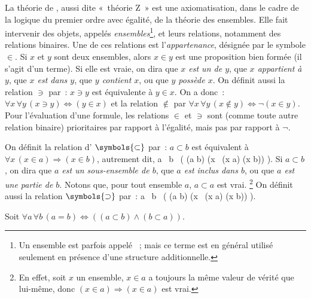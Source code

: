 \startsection[title=Théorie ZFC]

\startsubsection[title=La théorie de Zermelo, reference=sec:Zermelo]

La théorie de , aussi dite « théorie Z » est une axiomatisation, dans le cadre de la logique du premier ordre avec égalité, de la théorie des ensembles. 
Elle fait intervenir des objets, appelés \emph{ensembles}\footnote{Un ensemble est parfois appelé \emph{} ; mais ce terme est en général utilisé seulement en présence d'une structure additionnelle.}, et leurs relations, notamment des relations binaires. 
Une de ces relations est l'\emph{appartenance}, désignée par le symbole $\in$. 
Si $x$ et $y$ sont deux ensembles, alors $x \in y$ est une proposition bien formée (il s'agit d'un terme). 
Si elle est vraie, on dira que \emph{$x$ est un  de $y$}, que \emph{$x$ appartient à $y$}, que \emph{$x$ est dans $y$}, que \emph{$y$ contient $x$}, ou que \emph{$y$ possède $x$}.
On définit aussi la relation $\ni$ par : $x \ni y$ est équivalente à $y \in x$. 
On a donc : $\forall x \, \forall y \, (x \ni y) \Leftrightarrow (y \in x)$ et la relation $\notin$ par $\forall x \, \forall y \, (x \notin y) \Leftrightarrow \lnot (x \in y)$. 
Pour l'évaluation d'une formule, les relations $\in$ et $\ni$ sont (comme toute autre relation binaire) prioritaires par rapport à l'égalité, mais pas par rapport à $\lnot$.

On définit la relation d' $\symbols{\subset}$ par : $a \subset b$ est équivalent à $\forall x \, (x \in a) \Rightarrow (x \in b)$, autrement dit,
\startformula
    \forall a \, \forall b \, (
        (a \subset b) \Leftrightarrow (\forall x \, (x \in a) \Rightarrow (x \in b))
    ). 
\stopformula
Si $a \subset b$, on dira que \emph{$a$ est un sous-ensemble de $b$}, que \emph{$a$ est inclus dans $b$}, ou que \emph{$a$ est une partie de $b$}.
Notons que, pour tout ensemble $a$, $a \subset a$ est vrai.%
\footnote{En effet, soit $x$ un ensemble, $x \in a$ a toujours la même valeur de vérité que lui-même, donc $(x \in a) \Rightarrow (x \in a)$ est vrai.}
On définit aussi la relation $\symbols{\supset}$ par :
\startformula
    \forall a \, \forall b \, (
        (a \supset b) \Leftrightarrow (\forall x \, (x \in a) \Leftarrow (x \in b))
    ). 
\stopformula

\blank[medium]

\noindent{} Soit $\forall a \, \forall b \, (a = b) \Leftrightarrow ((a \subset b) \wedge (b \subset a))$.

